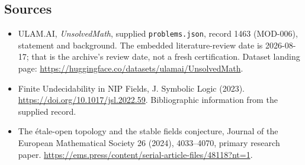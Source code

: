 \documentclass[11pt,a4paper]{article}
\begin{document}
\subsection{Sources}

{\small

\begin{itemize}

\item[\hypertarget{source:1463:1}{S1}] ULAM.AI, \emph{UnsolvedMath}, supplied \texttt{problems.json}, record 1463 (MOD-006), statement and background. The embedded literature-review date is 2026-08-17; that is the archive’s review date, not a fresh certification. Dataset landing page: \url{https://huggingface.co/datasets/ulamai/UnsolvedMath}.

\item[\hypertarget{source:1463:2}{S2}] Finite Undecidability in NIP Fields, J. Symbolic Logic (2023). \url{https://doi.org/10.1017/jsl.2022.59}. Bibliographic information from the supplied record.

\item[R1] The étale-open topology and the stable fields conjecture, Journal of the European Mathematical Society 26 (2024), 4033--4070, primary research paper.
\url{https://ems.press/content/serial-article-files/48118?nt=1}.
\end{itemize}

}

\label{end:1463}
\end{document}
